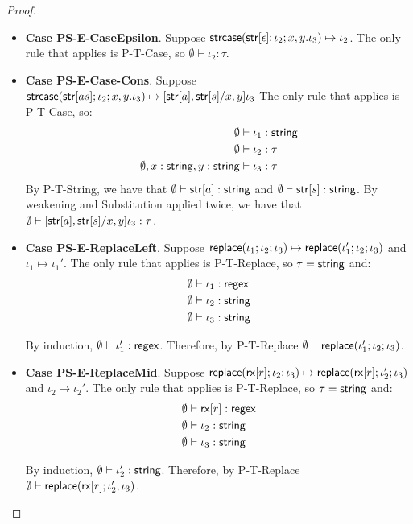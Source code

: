 \documentclass[11pt,leqno]{article}
\theoremstyle{definition}
\renewcommand{\tstr}[1]{{{\sf str}[#1]}}
\newcommand{\preplace}[3]{{\sf replace}(#1;#2;#3)}
\newcommand{\rx}[1]{ {\sf rx}[#1] }
\newcommand{\str}{{\sf string}}
\newcommand{\regex}{{\sf regex}}
\newcommand{\pstrcase}[3]{ {\sf strcase}(#1; #2; #3)}
\begin{document}
\begin{proof}
\begin{itemize}[label=$ $,itemsep=1ex]
\item \textbf{Case PS-E-CaseEpsilon}. 
Suppose $\pstrcase{\tstr{\epsilon}}{\iota_2}{x,y.\iota_3} \mapsto \iota_2$.
The only rule that applies is P-T-Case, so $\emptyset \vdash \iota_2 : \tau$.

\item \textbf{Case PS-E-Case-Cons}.
Suppose $\pstrcase{\tstr{as}}{\iota_2}{x,y.\iota_3} \mapsto [\tstr{a}, \tstr{s} / x,y] \iota_3$
The only rule that applies is P-T-Case, so:
\begin{align*}
  \emptyset &\vdash \iota_1 : \str \\
  \emptyset &\vdash \iota_2 : \tau \\
  \emptyset, x : \str, y : \str &\vdash \iota_3 : \tau
\end{align*}
By P-T-String, we have that $\emptyset \vdash \tstr{a} : \str$ and $\emptyset \vdash \tstr{s} : \str$. By weakening and Substitution applied twice, we have that $\emptyset \vdash [\tstr{a}, \tstr{s} / x,y] \iota_3 : \tau$.

\item \textbf{Case PS-E-ReplaceLeft}. 
Suppose $\preplace{\iota_1}{\iota_2}{\iota_3} \mapsto \preplace{\iota_1'}{\iota_2}{\iota_3}$
and $\iota_1 \mapsto \iota_1'$.
The only rule that applies is P-T-Replace, so $\tau=\str$ and:
\begin{align*}
  \emptyset &\vdash \iota_1 : \regex \\
  \emptyset &\vdash \iota_2 : \str \\
  \emptyset &\vdash \iota_3 : \str
\end{align*}

By induction, $\emptyset \vdash \iota_1' : \regex$.
Therefore, by P-T-Replace $\emptyset \vdash \preplace{\iota_1'}{\iota_2}{\iota_3}$.

\item \textbf{Case PS-E-ReplaceMid}. 
Suppose $\preplace{\rx{r}}{\iota_2}{\iota_3} \mapsto \preplace{\rx{r}}{\iota_2'}{\iota_3}$
and $\iota_2 \mapsto \iota_2'$.
The only rule that applies is P-T-Replace, so $\tau=\str$ and:
\begin{align*}
  \emptyset &\vdash \rx{r} : \regex \\
  \emptyset &\vdash \iota_2 : \str \\
  \emptyset &\vdash \iota_3 : \str
\end{align*}

By induction, $\emptyset \vdash \iota_2' : \str$.
Therefore, by P-T-Replace $\emptyset \vdash \preplace{\rx{r}}{\iota_2'}{\iota_3}$.


\end{itemize}
\end{proof}
\end{document}
